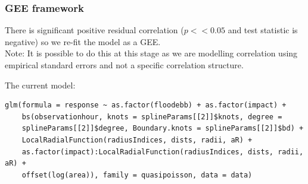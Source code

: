 \begin{frame}[fragile]
\frametitle{GEE framework}
\noindent There is significant positive residual correlation ($p<<0.05$ and test statistic is negative) so we re-fit the model as a GEE.\\

\noindent Note: It is possible to do this at this stage as we are modelling correlation using empirical standard errors and not a specific correlation structure.

\bigskip
\noindent The current model:
\footnotesize
\begin{verbatim}
glm(formula = response ~ as.factor(floodebb) + as.factor(impact) + 
    bs(observationhour, knots = splineParams[[2]]$knots, degree = 
    splineParams[[2]]$degree, Boundary.knots = splineParams[[2]]$bd) + 
    LocalRadialFunction(radiusIndices, dists, radii, aR) + 
    as.factor(impact):LocalRadialFunction(radiusIndices, dists, radii, aR) + 
    offset(log(area)), family = quasipoisson, data = data)
\end{verbatim}
\normalsize
\end{frame}

